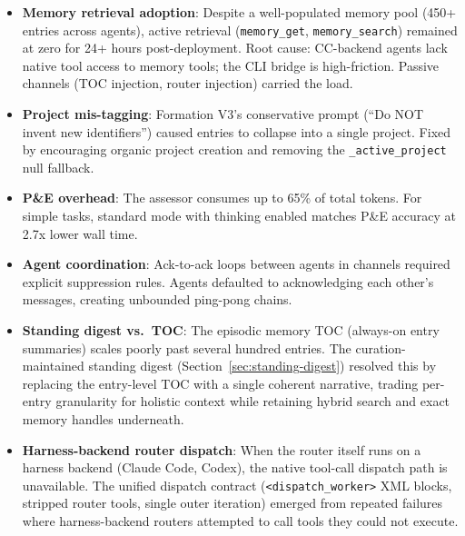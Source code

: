 \documentclass[11pt,letterpaper]{report}
\newcommand{\code}[1]{\texttt{#1}}
\begin{document}
\begin{itemize}[nosep]
  \item \textbf{Memory retrieval adoption}: Despite a well-populated
        memory pool (450+ entries across agents), active retrieval
        (\code{memory\_get}, \code{memory\_search}) remained at zero
        for 24+ hours post-deployment. Root cause: CC-backend agents
        lack native tool access to memory tools; the CLI bridge is
        high-friction. Passive channels (TOC injection, router injection)
        carried the load.
  \item \textbf{Project mis-tagging}: Formation V3's conservative
        prompt (``Do NOT invent new identifiers'') caused entries to
        collapse into a single project. Fixed by encouraging
        organic project creation and removing the
        \code{\_active\_project} null fallback.
  \item \textbf{P\&E overhead}: The assessor consumes up to 65\% of
        total tokens. For simple tasks, standard mode with thinking
        enabled matches P\&E accuracy at 2.7x lower wall time.
  \item \textbf{Agent coordination}: Ack-to-ack loops between agents
        in channels required explicit suppression rules. Agents
        defaulted to acknowledging each other's messages, creating
        unbounded ping-pong chains.
  \item \textbf{Standing digest vs.\ TOC}: The episodic memory TOC
        (always-on entry summaries) scales poorly past several hundred
        entries. The curation-maintained standing digest
        (Section~\ref{sec:standing-digest}) resolved this by replacing
        the entry-level TOC with a single coherent narrative, trading
        per-entry granularity for holistic context while retaining hybrid
        search and exact memory handles underneath.
  \item \textbf{Harness-backend router dispatch}: When the router itself
        runs on a harness backend (Claude Code, Codex), the native
        tool-call dispatch path is unavailable. The unified dispatch
        contract (\code{<dispatch\_worker>} XML blocks, stripped router
        tools, single outer iteration) emerged from repeated failures
        where harness-backend routers attempted to call tools they could
        not execute.
\end{itemize}
\end{document}
